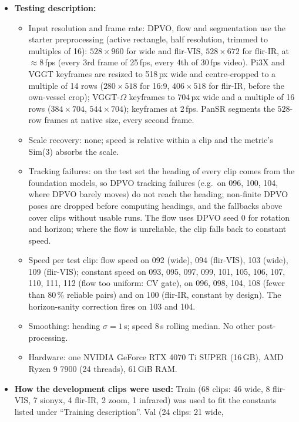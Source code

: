 \documentclass[11pt]{article}
\begin{document}
\begin{itemize}
  \item \textbf{Testing description:}
    \begin{itemize}[nosep]
      \item Input resolution and frame rate: DPVO, flow and segmentation use the starter preprocessing (active
        rectangle, half resolution, trimmed to multiples of 16): $528\times960$ for wide and flir-VIS,
        $528\times672$ for flir-IR, at $\approx$8\,fps (every 3rd frame of 25\,fps, every 4th of 30\,fps video).
        Pi3X and VGGT keyframes are resized to 518\,px wide and centre-cropped to a multiple of 14 rows
        ($280\times518$ for 16:9, $406\times518$ for flir-IR, before the own-vessel crop); VGGT-$\Omega$ keyframes to
        704\,px wide and a multiple of 16 rows ($384\times704$, $544\times704$); keyframes at 2\,fps. PanSR segments
        the $528$-row frames at native size, every second frame.
      \item Scale recovery: none; speed is relative within a clip and the metric's Sim(3) absorbs the scale.
      \item Tracking failures: on the test set the heading of every clip comes from the foundation models, so DPVO
        tracking failures (e.g.\ on 096, 100, 104, where DPVO barely moves) do not reach the heading; non-finite DPVO poses
        are dropped before computing headings, and the fallbacks above cover clips without usable runs. The flow uses
        DPVO seed 0 for rotation and horizon; where the flow is unreliable, the clip falls back to constant speed.
      \item Speed per test clip: flow speed on 092 (wide), 094 (flir-VIS), 103 (wide), 109 (flir-VIS); constant speed
        on 093, 095, 097, 099, 101, 105, 106, 107, 110, 111, 112 (flow too uniform: CV gate), on 096, 098, 104, 108
        (fewer than 80\,\% reliable pairs) and on 100 (flir-IR, constant by design). The horizon-sanity correction
        fires on 103 and 104.
      \item Smoothing: heading $\sigma=1$\,s; speed 8\,s rolling median. No other post-processing.
      \item Hardware: one NVIDIA GeForce RTX 4070 Ti SUPER (16\,GB), AMD Ryzen 9 7900 (24 threads), 61\,GiB RAM.
    \end{itemize}
  \item \textbf{How the development clips were used:} Train (68 clips: 46 wide, 8 flir-VIS, 7 sionyx, 4 flir-IR,
    2 zoom, 1 infrared) was used to fit the constants listed under ``Training description''. Val (24 clips: 21 wide,

\end{itemize}
\end{document}
